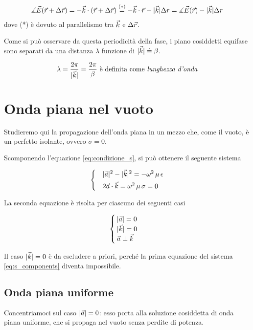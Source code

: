 \begin{itemize}
		\begin{equation*}
				\measuredangle \vec{E}(\vec{r} + \Delta\vec{r}) = -\vec{k} \cdot (\vec{r} + \Delta\vec{r}) \stackrel{(*)}{=} - \vec{k} \cdot \vec{r} - |\vec{k}| \Delta r = \measuredangle \vec{E}(\vec{r}) - |\vec{k}| \Delta r
		\end{equation*}
		dove (*) è dovuto al parallelismo tra $\vec{k}$ e $\Delta\vec{r}$.

		Come si può osservare da questa periodicità della fase, i piano cosiddetti equifase sono separati da una distanza $\lambda$ funzione di $|\vec{k}| \stackrel{.}{=} \beta$.

		\begin{equation} \label{eq:lunghezza_donda}
			\lambda = \frac{2 \pi}{|\vec{k}|} = \frac{2 \pi}{\beta} \text{ è definita come \emph{lunghezza d'onda}}
		\end{equation}
	\end{itemize}

\section{Onda piana nel vuoto}
	Studieremo qui la propagazione dell'onda piana in un mezzo che, come il vuoto, è un perfetto isolante, ovvero $\sigma = 0$.

	Scomponendo l'equazione \ref{eq:condizione_s}, si può ottenere il seguente sistema

	\begin{equation} \label{eq:s_components}
		\begin{dcases}
			& |\vec{a}|^2 - |\vec{k}|^2 = - \omega^2 \, \mu \, \epsilon \\
			& 2 \vec{a} \cdot \vec{k} = \omega^2 \, \mu \, \sigma = 0
		\end{dcases}
	\end{equation}

	La seconda equazione è risolta per ciascuno dei seguenti casi

	\begin{equation}\begin{cases}
		|\vec{a}| = 0 \\
		|\vec{k}| = 0 \\
		\vec{a} \perp \vec{k}
	\end{cases}\end{equation}

	Il caso $|\vec{k}| = 0$ è da escludere a priori, perché la prima equazione del sistema \ref{eq:s_components} diventa impossibile.

	\subsection{Onda piana uniforme}
		Concentriamoci sul caso $|\vec{a}| = 0$: esso porta alla soluzione cosiddetta di onda piana uniforme, che si propaga nel vuoto senza perdite di potenza.

